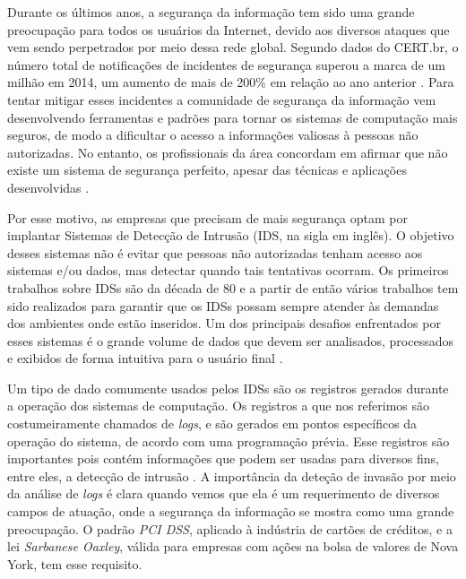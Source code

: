 \documentclass[
	12pt,				%
	openright,			%
	twoside,			%
	a4paper,			%
	english,			%
	spanish,			%
	brazil,				%
	]{abntex2}
\begin{document}
Durante os últimos anos, a segurança da informação tem sido uma grande preocupação para todos os usuários da Internet, devido aos diversos ataques que vem sendo perpetrados por meio dessa rede global. Segundo dados do CERT.br, o número total de notificações de incidentes de segurança superou a marca de um milhão em 2014, um aumento de mais de 200\% em relação ao ano anterior \cite{incidentes2015incidentes}. Para tentar mitigar esses incidentes a comunidade de segurança da informação vem desenvolvendo ferramentas e padrões para tornar os sistemas de computação mais seguros, de modo a dificultar o acesso a informações valiosas à pessoas não autorizadas. No entanto, os profissionais da área concordam em afirmar que não existe um sistema de segurança perfeito, apesar das técnicas e aplicações desenvolvidas \cite{dua2011data}.

Por esse motivo, as empresas que precisam de mais segurança optam por implantar Sistemas de Detecção de Intrusão (IDS, na sigla em inglês). O objetivo desses sistemas não é evitar que pessoas não autorizadas tenham acesso aos sistemas e/ou dados, mas detectar quando tais tentativas ocorram. Os primeiros trabalhos sobre IDSs são da década de 80 \cite{anderson1980computer, denning1987intrusion} e a partir de então vários trabalhos tem sido realizados para garantir que os IDSs possam sempre atender às demandas dos ambientes onde estão inseridos. Um dos principais desafios enfrentados por esses sistemas é o grande volume de dados que devem ser analisados, processados e exibidos de forma intuitiva para o usuário final \cite{big2013big, nassar2013secure}.


Um tipo de dado comumente usados pelos IDSs são os registros gerados durante a operação dos sistemas de computação. Os registros a que nos referimos são costumeiramente chamados de \emph{logs}, e são gerados em pontos específicos da operação do sistema, de acordo com uma programação prévia. Esse registros são importantes pois contém informações que podem ser usadas para diversos fins, entre eles, a detecção de intrusão \cite{jiang2008automated,oliner2012advances,nagappan2010abstracting}. A importância da deteção de invasão por meio da análise de \emph{logs} é clara quando vemos que ela é um requerimento de diversos campos de atuação, onde a segurança da informação se mostra como uma grande preocupação. O padrão \emph{PCI DSS}, aplicado à indústria de cartões de créditos, e a lei \emph{Sarbanese Oaxley}, válida para empresas com ações na bolsa de valores de Nova York, tem esse requisito.
\end{document}
